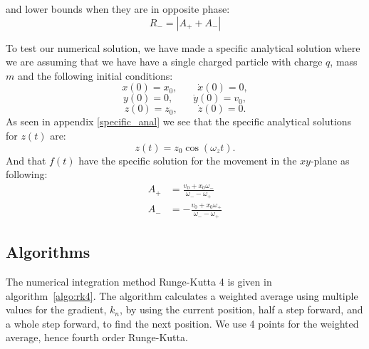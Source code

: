\documentclass[english,notitlepage,reprint,nofootinbib]{revtex4-1}  %
\begin{document}
and lower bounds when they are in opposite phase:
\begin{equation*}
	R_- = | A_+ + A_- |
\end{equation*}

To test our numerical solution, we have made a specific analytical solution where we are assuming that we have have a single charged particle with charge $q$, mass $m$ and the following initial conditions:
$$ x(0) = x_0, \qquad \dot{x}(0) = 0, $$
$$ y(0) = 0, \qquad \dot{y}(0) = v_0, $$
$$ z(0) = z_0, \qquad \dot{z}(0) = 0. $$
As seen in appendix \ref{specific_anal} we see that the specific analytical solutions for $z(t)$ are:
\begin{equation}
	z(t) = z_0 \cos (\omega_z t).
\end{equation}
And that $f(t)$ have the specific solution for the movement in the $xy$-plane as following:
\begin{align}
	A_+ &= \frac{v_0 + x_0 \omega_-}{\omega_- - \omega_+}\\
	A_- &= - \frac{v_0 + x_0 \omega_+}{\omega_- - \omega_+}
\end{align}
	
	
\subsection*{Algorithms}
%
The numerical integration method Runge-Kutta\cite{runge-kutta4} 4 is given in algorithm~\ref{algo:rk4}. The algorithm calculates a weighted average using multiple values for the gradient, $k_n$, by using the current position, half a step forward, and a whole step forward, to find the next position. We use 4 points for the weighted average, hence fourth order Runge-Kutta.
\end{document}
